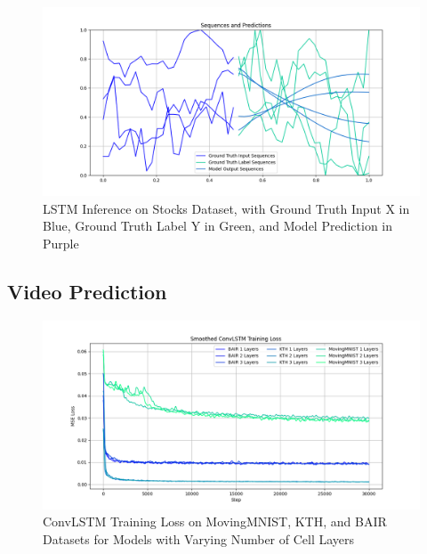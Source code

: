 \documentclass{scrartcl}
\begin{document}
\begin{figure}[H]
	\centering
	\includegraphics[width=1\textwidth]{inferences/stocks/3layer_s31.png}
	\caption{LSTM Inference on Stocks Dataset, with Ground Truth Input X in Blue, Ground Truth Label Y in Green, and Model Prediction in Purple}
	\label{inf:lstm_stocks_inference}
\end{figure}

\newpage
\subsection{Video Prediction}
\label{subsec:experiment_vp}

\begin{figure}[H]
	\centering
	\includegraphics[width=1\textwidth]{plots/convlstm_train_loss.png}
	\caption{ConvLSTM Training Loss on MovingMNIST, KTH, and BAIR Datasets for Models with Varying Number of Cell Layers}
	\label{plt:convlstm_train_loss}
\end{figure}
\end{document}
